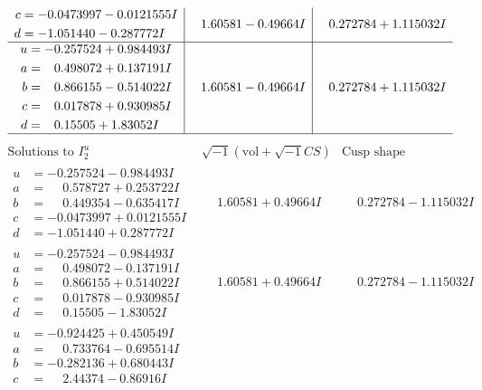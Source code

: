 \documentclass[1p]{elsarticle_modified}
\theoremstyle{definition}
\newcommand{\I}{\sqrt{-1}}
\begin{document}
$$\begin{array}{c|c|c}
\begin{aligned}
c &= -0.0473997 - 0.0121555 I \\
d &= -1.051440 - 0.287772 I\end{aligned}
 & \phantom{-}1.60581 - 0.49664 I & \phantom{-}0.272784 + 1.115032 I \\ \hline\begin{aligned}
u &= -0.257524 + 0.984493 I \\
a &= \phantom{-}0.498072 + 0.137191 I \\
b &= \phantom{-}0.866155 - 0.514022 I \\
c &= \phantom{-}0.017878 + 0.930985 I \\
d &= \phantom{-}0.15505 + 1.83052 I\end{aligned}
 & \phantom{-}1.60581 - 0.49664 I & \phantom{-}0.272784 + 1.115032 I\\
 \hline 
 \end{array}$$\newpage$$\begin{array}{c|c|c}  
\text{Solutions to }I^u_{2}& \I (\text{vol} + \sqrt{-1}CS) & \text{Cusp shape}\\
 \hline 
\begin{aligned}
u &= -0.257524 - 0.984493 I \\
a &= \phantom{-}0.578727 + 0.253722 I \\
b &= \phantom{-}0.449354 - 0.635417 I \\
c &= -0.0473997 + 0.0121555 I \\
d &= -1.051440 + 0.287772 I\end{aligned}
 & \phantom{-}1.60581 + 0.49664 I & \phantom{-}0.272784 - 1.115032 I \\ \hline\begin{aligned}
u &= -0.257524 - 0.984493 I \\
a &= \phantom{-}0.498072 - 0.137191 I \\
b &= \phantom{-}0.866155 + 0.514022 I \\
c &= \phantom{-}0.017878 - 0.930985 I \\
d &= \phantom{-}0.15505 - 1.83052 I\end{aligned}
 & \phantom{-}1.60581 + 0.49664 I & \phantom{-}0.272784 - 1.115032 I \\ \hline\begin{aligned}
u &= -0.924425 + 0.450549 I \\
a &= \phantom{-}0.733764 - 0.695514 I \\
b &= -0.282136 + 0.680443 I \\
c &= \phantom{-}2.44374 - 0.86916 I \\

\end{aligned}
\end{array}$$
\end{document}
